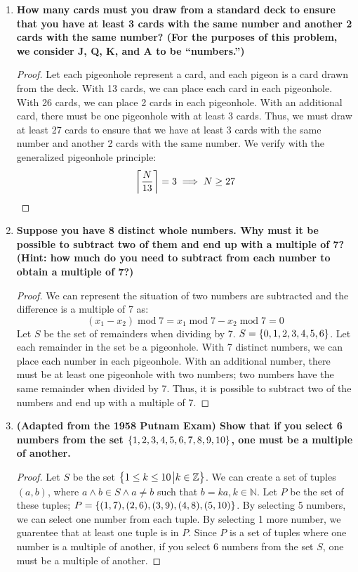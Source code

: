 \documentclass[article, 12pt]{article}
\theoremstyle{definition}
\DeclarePairedDelimiter\ceil{\lceil}{\rceil} %
\newcommand{\Mod}[1]{\;\mathrm{mod}\; #1} %
\DeclarePairedDelimiter\set{\{}{\}}
\newcommand{\ints}{\mathbb{Z}}
\newcommand{\nats}{\mathbb{N}}
\begin{document}
\begin{enumerate}[(1)]
    \item \textbf{How many cards must you draw from a standard deck to ensure that you have at least 3 cards with the same number and another 2 cards with the same number? (For the purposes of this problem, we consider J, Q, K, and A to be “numbers.”)}
    \begin{proof}
        Let each pigeonhole represent a card, and each pigeon is a card drawn from the deck. With 13 cards, we can place each card in each pigeonhole. With 26 cards, we can place 2 cards in each pigeonhole. With an additional card, there must be one pigeonhole with at least 3 cards. Thus, we must draw at least 27 cards to ensure that we have at least 3 cards with the same number and another 2 cards with the same number. We verify with the generalized pigeonhole principle:
        \begin{equation*}
            \ceil*{\frac{N}{13}} = 3 \implies N \geq 27
        \end{equation*}
    \end{proof}
    \item \textbf{Suppose you have 8 distinct whole numbers. Why must it be possible to subtract two of them and end up with a multiple of 7? (Hint: how much do you need to subtract from each number to obtain a multiple of 7?)}
    \begin{proof}
        We can represent the situation of two numbers are subtracted and the difference is a multiple of 7 as:
        \begin{equation*}
            (x_1 - x_2)\Mod{7} = x_1\Mod{7} - x_2\Mod{7} = 0
        \end{equation*}
        Let $S$ be the set of remainders when dividing by 7. $S = \set*{0,1,2,3,4,5,6}$. Let each remainder in the set be a pigeonhole. With 7 distinct numbers, we can place each number in each pigeonhole. With an additional number, there must be at least one pigeonhole with two numbers; two numbers have the same remainder when divided by 7. Thus, it is possible to subtract two of the numbers and end up with a multiple of 7.
    \end{proof}
    \item \textbf{(Adapted from the 1958 Putnam Exam) Show that if you select 6 numbers from the set $\set*{1, 2, 3, 4, 5, 6, 7, 8, 9, 10}$, one must be a multiple of another.}
    \begin{proof}
        Let $S$ be the set $\set*{1 \leq k \leq 10 \eval k \in \ints}$. We can create a set of tuples $(a,b)$, where $a \land b \in S \land a \neq b$ such that $b=ka, k \in \nats$. Let $P$ be the set of these tuples; $P = \set*{(1,7), (2,6), (3,9), (4,8), (5,10)}$. By selecting 5 numbers, we can select one number from each tuple. By selecting 1 more number, we guarentee that at least one tuple is in $P$. Since $P$ is a set of tuples where one number is a multiple of another, if you select 6 numbers from the set $S$, one must be a multiple of another.

\end{proof}
\end{enumerate}
\end{document}
